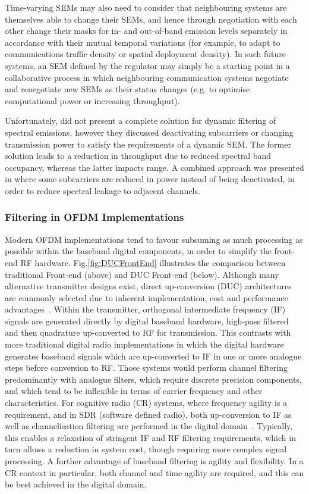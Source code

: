 Time-varying SEMs may also need to consider that neighbouring systems are themselves able to change their SEMs, and hence through negotiation with each other change their masks for in- and out-of-band emission levels separately in accordance with their mutual temporal variations (for example, to adapt to communications traffic density or spatial deployment density).
In such future systems, an SEM defined by the regulator may simply be a starting point in a collaborative process in which neighbouring communication systems negotiate and renegotiate new SEMs as their status changes (e.g. to optimise computational power or increasing throughput).

Unfortunately, \cite{Forde2010} did not present a complete solution for dynamic filtering of spectral emissions, however they discussed deactivating subcarriers or changing transmission power to satisfy the requirements of a dynamic SEM.
The former solution leads to a reduction in throughput due to reduced spectral band occupancy, whereas the latter impacts range.
A combined approach was presented in \cite{Kryszkiewicz2013} where some subcarriers are reduced in power instead of being deactivated, in order to reduce spectral leakage to adjacent channels.

\subsubsection{Filtering in OFDM Implementations}
\label{sec:how_ofdm_works}

Modern OFDM implementations tend to favour subsuming as much processing as possible within the baseband digital components, in order to simplify the front-end RF hardware.
Fig.\ref{fig:DUCFrontEnd} illustrates the comparison between traditional Front-end (above) and DUC Front-end (below).
Although many alternative transmitter designs exist, direct up-conversion (DUC) architectures are commonly selected due to inherent implementation, cost and performance advantages~\cite{masse2006direct}.
Within the transmitter, orthogonal intermediate frequency (IF) signals are generated directly by digital baseband hardware, high-pass filtered and then quadrature up-converted to RF for transmission.
This contrasts with more traditional digital radio implementations in which the digital hardware generates baseband signals which are up-converted to IF in one or more analogue steps before conversion to RF.
Those systems would perform channel filtering predominantly with analogue filters, which require discrete precision components, and which tend to be inflexible in terms of carrier frequency and other characteristics.
For cognitive radio (CR) systems, where frequency agility is a requirement, and in SDR (software defined radio), both up-conversion to IF as well as channelisation filtering are performed in the digital domain~\cite{Chen2005,Dowle2006}.
Typically, this enables a relaxation of stringent IF and RF filtering requirements, which in turn allows a reduction in system cost, though requiring more complex signal processing.
A further advantage of baseband filtering is agility and flexibility.
In a CR context in particular, both channel and time agility are required, and this can be best achieved in the digital domain.

